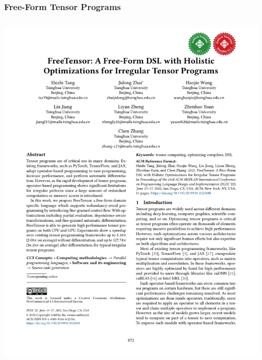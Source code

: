 \documentclass[12pt,aspectratio=169]{beamer}
\begin{document}
    \begin{frame}
        \frametitle{Free-Form Tensor Programs}

        \begin{columns}
            \begin{column}{0.5\textwidth}
                \includegraphics[page=5,trim=1.9cm 8.5cm 10.5cm 12cm,clip,scale=.8]{paper.pdf}
            \end{column}
\end{columns}
\end{frame}
\end{document}
